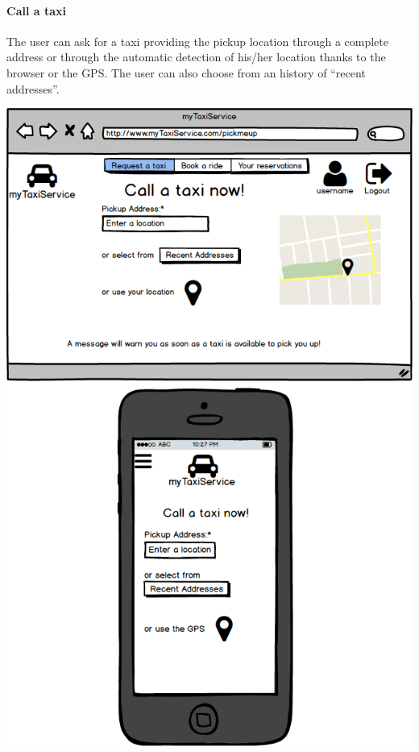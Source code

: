 \documentclass[a4paper,11pt]{report} %
\begin{document}
	\paragraph{Call a taxi} The user can ask for a taxi providing the pickup location through a complete address or through the automatic detection of his/her location thanks to the browser or the GPS. The user can also choose from an history of ``recent addresses''.
	\begin{center}
		\includegraphics[width=0.9\linewidth]{Pictures/CallATaxi}
	\end{center}
	\pagebreak
	
\end{document}
